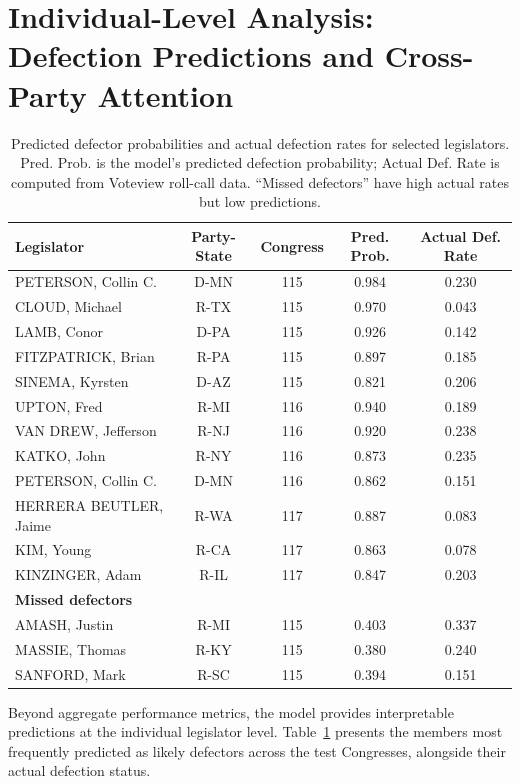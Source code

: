 \documentclass[12pt, a4paper]{article}
\begin{document}
\section{Individual-Level Analysis: Defection Predictions and Cross-Party Attention}

\begin{table}[!b]
\centering
{\footnotesize
\caption{Predicted defector probabilities and actual defection rates for selected legislators. Pred. Prob. is the model's predicted defection probability; Actual Def. Rate is computed from Voteview roll-call data. ``Missed defectors'' have high actual rates but low predictions.}
\label{tab:defectors}
\begin{tabular}{lcccc}
\toprule
Legislator & Party-State & Congress & Pred. Prob. & Actual Def. Rate \\
\midrule
PETERSON, Collin C. & D-MN & 115 & 0.984 & 0.230 \\
CLOUD, Michael & R-TX & 115 & 0.970 & 0.043 \\
LAMB, Conor & D-PA & 115 & 0.926 & 0.142 \\
FITZPATRICK, Brian & R-PA & 115 & 0.897 & 0.185 \\
SINEMA, Kyrsten & D-AZ & 115 & 0.821 & 0.206 \\
\midrule
UPTON, Fred & R-MI & 116 & 0.940 & 0.189 \\
VAN DREW, Jefferson & R-NJ & 116 & 0.920 & 0.238 \\
KATKO, John & R-NY & 116 & 0.873 & 0.235 \\
PETERSON, Collin C. & D-MN & 116 & 0.862 & 0.151 \\
\midrule
HERRERA BEUTLER, Jaime & R-WA & 117 & 0.887 & 0.083 \\
KIM, Young & R-CA & 117 & 0.863 & 0.078 \\
KINZINGER, Adam & R-IL & 117 & 0.847 & 0.203 \\
\midrule
\textbf{Missed defectors} & & & & \\
AMASH, Justin & R-MI & 115 & 0.403 & 0.337 \\
MASSIE, Thomas & R-KY & 115 & 0.380 & 0.240 \\
SANFORD, Mark & R-SC & 115 & 0.394 & 0.151 \\
\bottomrule
\end{tabular}
}
\end{table}

Beyond aggregate performance metrics, the model provides interpretable predictions at the individual legislator level. Table~\ref{tab:defectors} presents the members most frequently predicted as likely defectors across the test Congresses, alongside their actual defection status.
\end{document}
